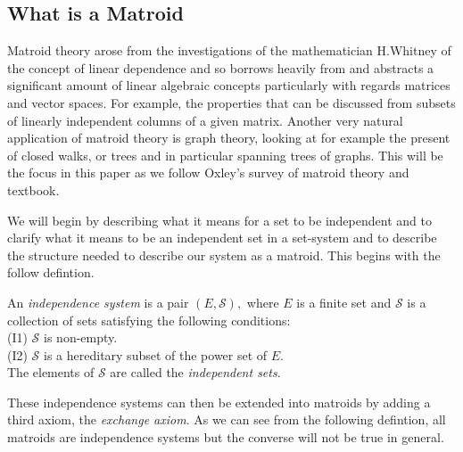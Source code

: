 \documentclass[../main.tex]{subfiles}
\begin{document}
\subsection{What is a Matroid}
Matroid theory arose from the investigations of the mathematician H.Whitney \cite{whitney} of the concept of linear dependence and so borrows heavily from and abstracts a significant amount of linear algebraic concepts particularly with regards  matrices and vector spaces. For example, the properties that can be discussed from subsets of linearly independent columns of a given  matrix. Another very natural application of matroid theory is graph theory, looking at for example the present of closed walks, or trees and in particular spanning trees of graphs. This will be the focus in this paper as we follow Oxley's survey of matroid theory\cite{ox_paper} and textbook.\cite{ox_book}\\ 

\vspace{1mm}

\noindent We will begin by describing what it means for a set to be independent and to clarify what it means to be an independent set in a set-system and to describe the structure needed to describe our system as a matroid. This begins with the follow defintion.

\begin{defn}
An \textit{independence system} is a pair $(E,\mathcal{S}),$ where $E$ is a finite set and $\mathcal{S}$ is a collection of sets satisfying the following conditions:\\
\noindent (I1) $\mathcal{S}$ is non-empty.\\
\noindent (I2) $\mathcal{S}$ is a  hereditary subset of the power set of $E$.\\
\noindent The elements of $\mathcal{S}$ are called the \textit{independent sets}.
\end{defn}

\noindent These independence systems can then be extended into matroids by adding a third axiom, the \textit{exchange axiom}. As we can see from the following defintion, all matroids are independence systems but the converse will not be true in general.
\end{document}
